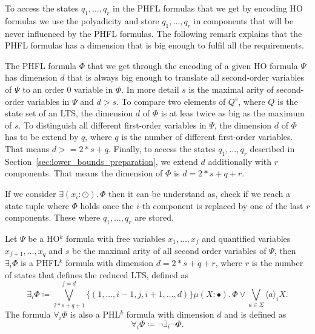 To access the states $q_1, \dots, q_r$ in the PHFL formulas that we get by encoding HO formulas we use the polyadicity and store $q_1, \dots, q_r$ in components that will be never influenced by the PHFL formulas. The following remark explains that the PHFL formulas has a dimension that is big enough to fulfil all the requirements. 

\begin{remark}
    The PHFL formula $\Phi$ that we get through the encoding of a given HO formula $\Psi$ has dimension
    $d$ that is always big enough to translate all second-order variables of $\Psi$ to an order $0$ variable in
    $\Phi$. In more detail $s$ is the maximal arity of second-order variables in $\Psi$ and $d > s$. To compare
    two  elements of $Q^{s}$, where $Q$ is the state set of an LTS, the dimension $d$ of 
    $\Phi$ is  at leas twice as big as the maximum of $s$. To distinguish all
    different first-order variables in $\Psi$, the dimension $d$ of $\Phi$ has to be extend by $q$, where $q$ is the number of different first-order variables. That means $d >= 2 * s + q$. Finally, to access the 
    states $q_1, \dots, q_r$ described in Section~\ref{sec:lower_bounds_preparation}, 
    we extend $d$ additionally with $r$ components. That means the dimension of $\Phi$ is $d = 2 * s + q + r$.
\end{remark}

If we consider $\exists (x_i \colon \odot).\,\Phi$ then it can be understand as, check if we reach a state tuple where $
\Phi$ holds once the $i$-th component is replaced by one of the last $r$ components. These where $q_1, \dots, q_r$ are stored.

\begin{definition}
    Let $\Psi$ be a HO$^k$ formula with free variables $x_1, \dots, x_f$ and quantified variables $x_{f+1}, \dots,
    x_q$ and $s$ be the maximal arity of all second order variables of $\Psi$, then $\exists_i \Phi$ is a PHFL$^k$
    formula with dimension $d = 2 * s + q+ r$, where $r$ is the number of states that defines the 
    reduced LTS, defined as
    \[\exists_i \Phi \coloneqq \bigvee^{j=d}_{2*s+q+1} \{(1, \dots, i-1, j, i + 1, \dots, d)\} \mu (X
    \colon \bullet).\,\Phi \vee \bigvee_{a \in \Sigma} \langle a \rangle_{i} X.\]
    The formula $\forall_i \Phi$ is also a PHL$^k$ formula with dimension $d$ and is defined as
    \[\forall_i \Phi \coloneqq \neg \exists_i \neg \Phi.\]
\end{definition}

